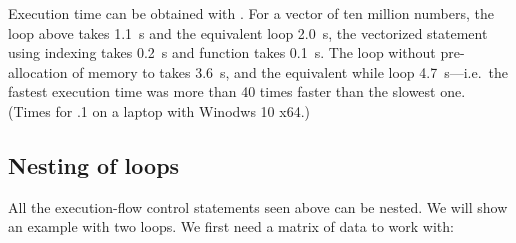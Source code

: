 \documentclass[krantz2]{krantz}\usepackage{knitr}%
\begin{document}
\begin{explainbox}
\begin{knitrout}\footnotesize
{}\color{fgcolor}\begin{kframe}
\begin{alltt}
 \hlkwb{<-} \hlstd{a[}\hlopt{:}\hlstd{(a)]} \hlopt{-} \hlstd{a[}\hlopt{:}\hlopt{-}\hlstd{]}
\end{alltt}
\end{kframe}
\end{knitrout}

\begin{knitrout}\footnotesize
{}\color{fgcolor}\begin{kframe}
\begin{alltt}
 \hlkwb{<-} 
\end{alltt}
\end{kframe}
\end{knitrout}

Execution time can be obtained with . For a vector of ten million numbers, the  loop above takes 1.1~s and the equivalent  loop 2.0~s, the vectorized statement using indexing takes 0.2~s and function  takes 0.1~s. The  loop without pre-allocation of memory to  takes 3.6~s, and the equivalent while loop 4.7~s---i.e.\ the fastest execution time was more than 40 times faster than the slowest one. (Times for .1 on a laptop with Winodws 10 x64.)

\end{explainbox}

\subsection{Nesting of loops}\label{sec:nested:loops}

All the execution-flow control statements seen above can be nested. We will show an example with two  loops. We first need a matrix of data to work with:
\end{document}
